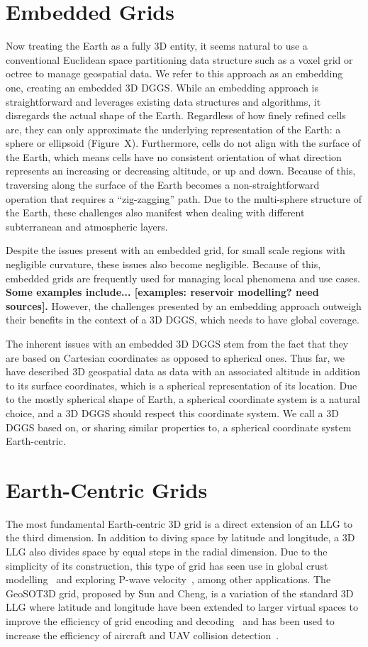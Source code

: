 \section{Embedded Grids}
Now treating the Earth as a fully 3D entity, it seems natural to use a conventional Euclidean space partitioning data structure such as a voxel grid or octree to manage geospatial data.
We refer to this approach as an embedding one, creating an embedded 3D DGGS.
While an embedding approach is straightforward and leverages existing data structures and algorithms, it disregards the actual shape of the Earth.
Regardless of how finely refined cells are, they can only approximate the underlying representation of the Earth: a sphere or ellipsoid (Figure~X).
Furthermore, cells do not align with the surface of the Earth, which means cells have no consistent orientation of what direction represents an increasing or decreasing altitude, or up and down.
Because of this, traversing along the surface of the Earth becomes a non-straightforward operation that requires a ``zig-zagging'' path.
Due to the multi-sphere structure of the Earth, these challenges also manifest when dealing with different subterranean and atmospheric layers.


Despite the issues present with an embedded grid, for small scale regions with negligible curvature, these issues also become negligible.
Because of this, embedded grids are frequently used for managing local phenomena and use cases.
\textbf{Some examples include... [examples: reservoir modelling? need sources].}
However, the challenges presented by an embedding approach outweigh their benefits in the context of a 3D DGGS, which needs to have global coverage.


The inherent issues with an embedded 3D DGGS stem from the fact that they are based on Cartesian coordinates as opposed to spherical ones.
Thus far, we have described 3D geospatial data as data with an associated altitude in addition to its surface coordinates, which is a spherical representation of its location.
Due to the mostly spherical shape of Earth, a spherical coordinate system is a natural choice, and a 3D DGGS should respect this coordinate system.
We call a 3D DGGS based on, or sharing similar properties to, a spherical coordinate system Earth-centric.


\section{Earth-Centric Grids}
The most fundamental Earth-centric 3D grid is a direct extension of an LLG to the third dimension.
In addition to diving space by latitude and longitude, a 3D LLG also divides space by equal steps in the radial dimension.
Due to the simplicity of its construction, this type of grid has seen use in global crust modelling~\cite{bassin2000current} and exploring P-wave velocity~\cite{zhao2004global}, among other applications.
The GeoSOT3D grid, proposed by Sun and Cheng, is a variation of the standard 3D LLG where latitude and longitude have been extended to larger virtual spaces to improve the efficiency of grid encoding and decoding~\cite{sun20153d} and has been used to increase the efficiency of aircraft and UAV collision detection~\cite{miao2019low, zhai2019collision}.


